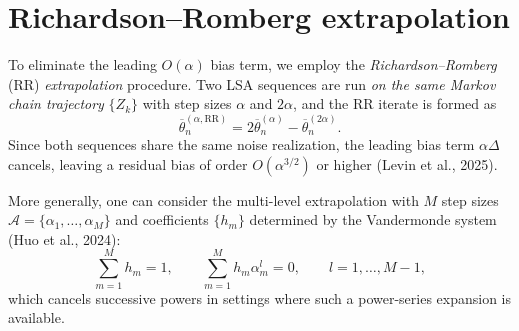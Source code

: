 \section{Richardson--Romberg extrapolation}

To eliminate the leading $O(\alpha)$ bias term, we employ the
\emph{Richardson--Romberg} (RR) \emph{extrapolation} procedure. Two LSA
sequences are run \emph{on the same Markov chain trajectory} $\{Z_k\}$ with
step sizes $\alpha$ and $2\alpha$, and the RR iterate is formed as
\begin{equation}
  \overline{\theta}_n^{(\alpha,\mathrm{RR})}
  =2\overline{\theta}_n^{(\alpha)}
   -\overline{\theta}_n^{(2\alpha)}.
  \label{eq:rr-iterate}
\end{equation}
Since both sequences share the same noise realization, the leading bias term
$\alpha\Delta$ cancels, leaving a residual bias of order
$O(\alpha^{3/2})$ or higher (Levin et al., 2025).

More generally, one can consider the multi-level extrapolation with $M$ step
sizes $\mathcal{A}=\{\alpha_1,\ldots,\alpha_M\}$ and coefficients
$\{h_m\}$ determined by the Vandermonde system (Huo et al., 2024):
\[
  \sum_{m=1}^M h_m=1,
  \qquad
  \sum_{m=1}^M h_m\alpha_m^l=0,
  \qquad l=1,\ldots,M-1,
\]
which cancels successive powers in settings where such a power-series
expansion is available.
